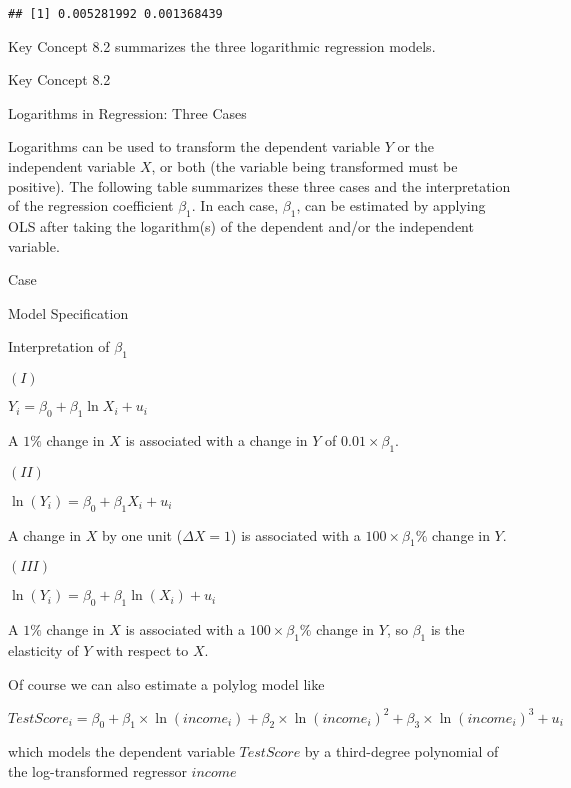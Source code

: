 \documentclass[]{book}
\theoremstyle{definition}
\theoremstyle{definition}
\theoremstyle{definition}
\theoremstyle{remark}
\begin{document}
\begin{verbatim}
## [1] 0.005281992 0.001368439
\end{verbatim}

Key Concept 8.2 summarizes the three logarithmic regression models.

Key Concept 8.2

Logarithms in Regression: Three Cases

Logarithms can be used to transform the dependent variable \(Y\) or the
independent variable \(X\), or both (the variable being transformed must
be positive). The following table summarizes these three cases and the
interpretation of the regression coefficient \(\beta_1\). In each case,
\(\beta_1\), can be estimated by applying OLS after taking the
logarithm(s) of the dependent and/or the independent variable.

Case

Model Specification

Interpretation of \(\beta_1\)

\((I)\)

\(Y_i = \beta_0 + \beta_1 \ln{X_i} + u_i\)

A \(1 \%\) change in \(X\) is associated with a change in \(Y\) of
\(0.01 \times \beta_1\).

\((II)\)

\(\ln(Y_i) = \beta_0 + \beta_1 X_i + u_i\)

A change in \(X\) by one unit (\(\Delta X = 1\)) is associated with a
\(100 \times \beta_1 \%\) change in \(Y\).

\((III)\)

\(\ln(Y_i) = \beta_0 + \beta_1 \ln(X_i) + u_i\)

A \(1 \%\) change in \(X\) is associated with a
\(100 \times \beta_1 \%\) change in \(Y\), so \(\beta_1\) is the
elasticity of \(Y\) with respect to \(X\).

Of course we can also estimate a polylog model like

\[ TestScore_i = \beta_0 + \beta_1 \times \ln(income_i) + \beta_2 \times \ln(income_i)^2 + \beta_3 \times \ln(income_i)^3 + u_i \]

which models the dependent variable \(TestScore\) by a third-degree
polynomial of the log-transformed regressor \(income\)
\end{document}
